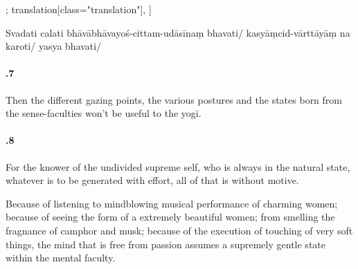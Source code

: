 \begin{alignment}[
  texts=edition[class="edition"];
  translation[class="translation"],
  ]
\begin{edition}
\begin{prose}
Svadati calati
bhāvābhāvayoś-cittam-udāsīnaṃ bhavati/
kasyāṃcid-vārttāyāṃ
 na karoti/
yasya
bhavati/
    \end{prose}
  \end{edition}
  \begin{translation}
    \begin{tlate}
\paragraph{.7} Then the different gazing points, the various postures and the states born from the sense-faculties won't be useful to the yogī. 

\paragraph{.8} For the knower of the undivided supreme self, who is always in the natural state, whatever is to be generated with effort, all of that is without motive.
\bigskip

Because of listening to mindblowing musical performance of charming women; because of seeing the form of a extremely beautiful women; from smelling the fragnance of camphor and musk; because of the execution of touching of very soft things, the mind that is free from passion assumes a supremely gentle state within the mental faculty.


\end{tlate}
\end{translation}
\end{alignment}
